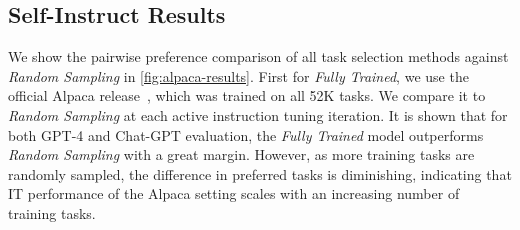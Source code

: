 \subsection{Self-Instruct Results}
\label{alpaca-result}
We show the pairwise preference comparison of all task selection methods against \textit{Random Sampling} in \autoref{fig:alpaca-results}.
First for \textit{Fully Trained}, we use the official Alpaca release~\cite{alpaca}, which was trained on all 52K tasks. We compare it to \textit{Random Sampling} at each active instruction tuning iteration. It is shown that for both GPT-4 and Chat-GPT evaluation, the \textit{Fully Trained} model outperforms \textit{Random Sampling} with a great margin. However, as more training tasks are randomly sampled, the difference in preferred tasks is diminishing, indicating that IT performance of the Alpaca setting scales with an increasing number of training tasks.

